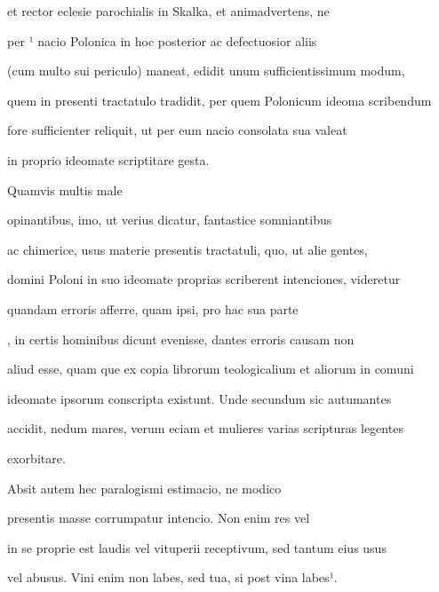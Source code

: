 et rector eclesie parochialis in Skalka, et animadvertens, ne 

 per ¹ nacio Polonica in hoc posterior ac defectuosior aliis

(cum multo sui periculo) maneat, edidit unum sufficientissimum modum,

quem in presenti tractatulo tradidit, per quem Polonicum ideoma scribendum

fore sufficienter reliquit, ut per eum nacio consolata sua valeat

\splitlines{}

in proprio ideomate scriptitare gesta.

\indentP Quamvis multis male

\fulllines{}

opinantibus, imo, ut verius dicatur, fantastice somniantibus

ac chimerice, usus materie presentis tractatuli, quo, ut alie gentes,

domini Poloni in suo ideomate proprias scriberent intenciones, videretur 

 quandam erroris afferre, quam ipsi, pro hac sua parte 

, in certis hominibus dicunt evenisse, dantes erroris causam non

aliud esse, quam que ex copia librorum teologicalium et aliorum in comuni

ideomate ipsorum conscripta existunt. Unde secundum sic autumantes

accidit, nedum mares, verum eciam et mulieres varias scripturas legentes

\splitlines{}

exorbitare.

\indentK Absit autem hec paralogismi estimacio, ne modico 

\fulllines{}

 presentis masse corrumpatur intencio. Non enim res vel 

 in se proprie est laudis vel vituperii receptivum, sed tantum eius usus

vel abusus. Vini enim non labes, sed tua, si post vina labes¹.

